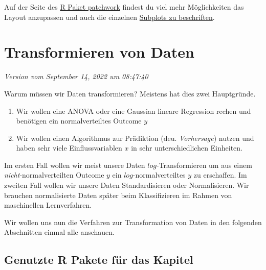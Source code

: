 \documentclass[
  letterpaper,
]{scrbook}
\providecommand{\tightlist}{%
  \setlength{\itemsep}{0pt}\setlength{\parskip}{0pt}}\usepackage{longtable,booktabs,array}
\begin{document}
Auf der Seite des
\href{https://patchwork.data-imaginist.com/articles/patchwork.html}{R
Paket patchwork} findest du viel mehr Möglichkeiten das Layout
anzupassen und auch die einzelnen
\href{https://patchwork.data-imaginist.com/articles/guides/annotation.html}{Subplots
zu beschriften}.

\hypertarget{sec-eda-transform}{%
\chapter{Transformieren von Daten}\label{sec-eda-transform}}

\emph{Version vom September 14, 2022 um 08:47:40}


Warum müssen wir Daten transformieren? Meistens hat dies zwei
Hauptgründe.

\begin{enumerate}
\def\labelenumi{\arabic{enumi})}
\tightlist
\item
  Wir wollen eine ANOVA oder eine Gaussian lineare Regression rechen und
  benötigen ein normalverteiltes Outcome \(y\)
\item
  Wir wollen einen Algorithmus zur Prädiktion (deu. \emph{Vorhersage})
  nutzen und haben sehr viele Einflussvariablen \(x\) in sehr
  unterschiedlichen Einheiten.
\end{enumerate}

Im ersten Fall wollen wir meist unsere Daten \(log\)-Transformieren um
aus einem \emph{nicht}-normalverteilten Outcome \(y\) ein
\(log\)-normalverteiltes \(y\) zu erschaffen. Im zweiten Fall wollen wir
unsere Daten Standardisieren oder Normalisieren. Wir brauchen
normalisierte Daten später beim Klassifizieren im Rahmen von
maschinellen Lernverfahren.

Wir wollen uns nun die Verfahren zur Transformation von Daten in den
folgenden Abschnitten einmal alle anschauen.

\hypertarget{genutzte-r-pakete-fuxfcr-das-kapitel-3}{%
\section{Genutzte R Pakete für das
Kapitel}\label{genutzte-r-pakete-fuxfcr-das-kapitel-3}}
\end{document}
